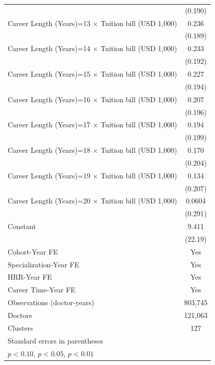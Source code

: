 {\begin{tabular}{l*{1}{c}}
                    &     (0.190)         \\
[1em]
Career Length (Years)=13 $\times$ Tuition bill (USD 1,000)&       0.236         \\
                    &     (0.189)         \\
[1em]
Career Length (Years)=14 $\times$ Tuition bill (USD 1,000)&       0.233         \\
                    &     (0.192)         \\
[1em]
Career Length (Years)=15 $\times$ Tuition bill (USD 1,000)&       0.227         \\
                    &     (0.194)         \\
[1em]
Career Length (Years)=16 $\times$ Tuition bill (USD 1,000)&       0.207         \\
                    &     (0.196)         \\
[1em]
Career Length (Years)=17 $\times$ Tuition bill (USD 1,000)&       0.194         \\
                    &     (0.199)         \\
[1em]
Career Length (Years)=18 $\times$ Tuition bill (USD 1,000)&       0.170         \\
                    &     (0.204)         \\
[1em]
Career Length (Years)=19 $\times$ Tuition bill (USD 1,000)&       0.134         \\
                    &     (0.207)         \\
[1em]
Career Length (Years)=20 $\times$ Tuition bill (USD 1,000)&      0.0604         \\
                    &     (0.291)         \\
[1em]
Constant            &       9.411         \\
                    &     (22.19)         \\
[1em]
Cohort-Year FE      &         Yes         \\
[1em]
Specialization-Year FE&         Yes         \\
[1em]
HRR-Year FE         &         Yes         \\
[1em]
Career Time-Year FE &         Yes         \\
\hline
Observations (doctor-years)&     803,745         \\
Doctors             &     121,063         \\
Clusters            &         127         \\
\hline\hline
\multicolumn{2}{l}{\footnotesize Standard errors in parentheses}\\
\multicolumn{2}{l}{\footnotesize \sym{*} \(p<0.10\), \sym{**} \(p<0.05\), \sym{***} \(p<0.01\)}\\
\end{tabular}
}
